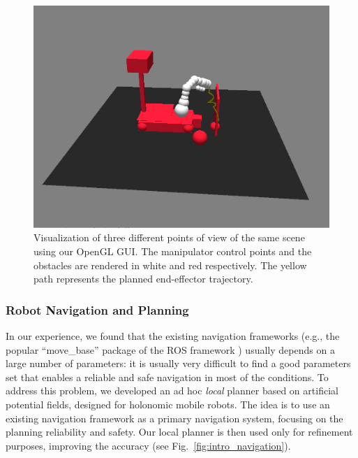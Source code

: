 \documentclass[conference]{IEEEtran}
\begin{document}
\begin{figure}[h!]
\begin{center}
\begin{minipage}[b]{0.32\linewidth}
	\begin{center}\includegraphics[angle=0,width=\linewidth]{images/av9.png}\end{center}
\end{minipage}\hfill
\end{center}
\caption{Visualization of three different points of view of the same scene using our OpenGL GUI. The manipulator control points and the obstacles are rendered in white and red respectively. The yellow path represents the planned end-effector trajectory. }\label{fig:intro_manipulation}
\end{figure}


\subsubsection{Robot Navigation and Planning}\label{sec:navigation}


In our experience, we found that the existing navigation frameworks (e.g., the popular ``move\_base'' package of the ROS framework \cite{rosweb}) usually depends on a large number of parameters: it is usually very difficult to find a good parameters set that enables a reliable and safe navigation in most of the conditions. To address this problem, we developed an ad hoc \textit{local} planner based on artificial potential fields, designed for holonomic mobile robots. The idea is to use an existing navigation framework as a primary navigation system, focusing on the planning reliability and safety. Our local planner is then used only for refinement purposes, improving the accuracy (see Fig.~\ref{fig:intro_navigation}).
\end{document}
